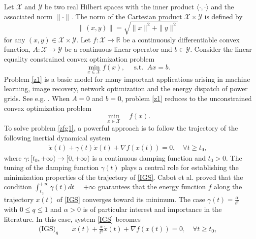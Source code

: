 \documentclass[review]{elsarticle}
\begin{document}
	Let $\mathcal{X}$ and $\mathcal{Y}$ be two real Hilbert spaces with the inner product $\langle \cdot, \cdot\rangle$ and the associated norm $\|\cdot\|$. The norm of the Cartesian product $\mathcal{X}\times\mathcal{Y}$ is defined by
	$$ \|(x,y)\|=\sqrt{\|x\|^2+\|y\|^2}$$
	for any $(x,y)\in \mathcal{X}\times\mathcal{Y}$.
	Let $f: \mathcal{X}\rightarrow \mathbb{R}$ be a continuously differentiable convex function, $A: \mathcal{X}\rightarrow \mathcal{Y}$ be a continuous linear operator and $b\in\mathcal{Y}$. Consider the linear equality constrained convex optimization problem
	\begin{equation}\label{z1}
		\min_{x\in\mathcal{X}} f(x), \quad \text{ s.t. }  \  Ax = b.
	\end{equation}
	Problem \eqref{z1} is a basic model for many important applications arising in machine learning, image recovery, network optimization and the energy dispatch of power grids. See e.g. \cite{ZLinandLiHandFang(2020),GoldsteinTandDonoghue(2014),ZengXLandLeiJLandChenJ(2022), PYiandHongYandLiu(2015)}. When $A=0$ and $b=0$, problem \eqref{z1} reduces to the unconstrained convex optimization problem
	\begin{equation}\label{zfg1}
		\min_{x\in\mathcal{X}}  \quad f(x).
	\end{equation} 
To solve   problem \eqref{zfg1}, a powerful approach is to follow the trajectory of the following inertial dynamical system
\begin{eqnarray}\label{IGS}
			\ddot{x}(t)+\gamma(t) \dot{x}(t)+\nabla f(x(t))=0,\quad\forall t\ge t_0,
	\end{eqnarray}	
where  $\gamma:[t_0,+\infty)\to [0,+\infty)$ is a continuous damping function and $t_0>0$. The tuning of the damping function $\gamma(t)$ plays a central role for establishing the minimization properties of the trajectory of \eqref{IGS}.  Cabot et al. \cite{Cabot} proved that the condition $\int_{t_0}^{+\infty} \gamma(t)dt=+\infty$ guarantees that the energy function $f$ along the trajectory $x(t)$ of  \eqref{IGS} converges toward its minimum.  The  case $\gamma(t)=\frac{\alpha}{t^q}$ with $0\le q\le 1$ and $\alpha>0$ is  of particular interest and importance in the literature. In this case, system \eqref{IGS} becomes
	\begin{eqnarray*}
		\text{(IGS)}_{q}\quad\quad
		\ddot{x}(t)+\frac{\alpha}{t^{q}} \dot{x}(t)+\nabla f(x(t))=0,\quad\forall t\ge t_0,
	\end{eqnarray*}
\end{document}
